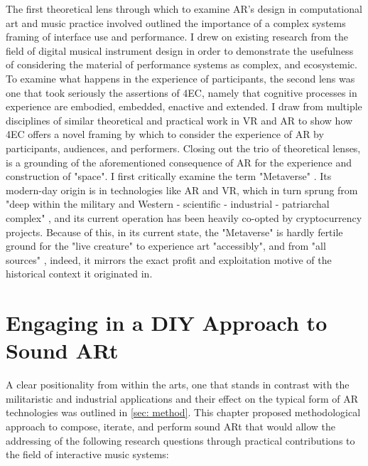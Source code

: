 The first theoretical lens through which to examine AR's design in computational art and music practice involved outlined the importance of a complex systems framing of interface use and performance. I drew on existing research from the field of digital musical instrument design \citep{magnusson2009a,discipio2003,essl2006,armstrong2006,hayes2019,chevalier2018} in order to demonstrate the usefulness of considering the material of performance systems as complex, and ecosystemic. To examine what happens in the experience of participants, the second lens was one that took seriously the assertions of 4EC, namely that cognitive processes in experience are embodied, embedded, enactive and extended. I draw from multiple disciplines of similar theoretical and practical work in VR and AR to show how 4EC offers a novel framing by which to consider the experience of AR by participants, audiences, and performers. Closing out the trio of theoretical lenses, is a grounding of the aforementioned consequence of AR for the experience and construction of "space". I first critically examine the term "Metaverse" \citep{stephenson1992}. Its modern-day origin is in technologies like AR and VR, which in turn sprung from "deep within the military and Western - scientific - industrial - patriarchal complex" \citep{davies2004}, and its current operation has been heavily co-opted by cryptocurrency projects. Because of this, in its current state, the "Metaverse" is hardly fertile ground for the "live creature" to experience art "accessibly", and from "all sources" \citep{dewey1934,leddy2021}, indeed, it mirrors the exact profit and exploitation motive of the historical context it originated in.



\section{Engaging in a DIY Approach to Sound ARt} \label{sec: discussion-method}
A clear positionality from within the arts, one that stands in contrast with the militaristic and industrial applications and their effect on the typical form of AR technologies was outlined in \autoref{sec: method}. This chapter proposed methodological approach to compose, iterate, and perform sound ARt that would allow the addressing of the following research questions through practical contributions to the field of interactive music systems: 

\begin{enumerate}
    \RQmedium
    \RQexperience
    \RQfuture
\end{enumerate}

